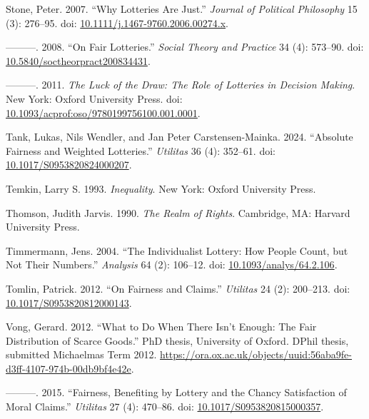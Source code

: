 \documentclass[
  11pt,
  letterpaper,
  DIV=11,
  numbers=noendperiod,
  twoside]{scrartcl}
\newlength{\cslhangindent}
\newenvironment{CSLReferences}[2] %
 {\begin{list}{}{%
  \setlength{\itemindent}{0pt}
  \setlength{\leftmargin}{0pt}
  \setlength{\parsep}{0pt}
  \ifodd #1
   \setlength{\leftmargin}{\cslhangindent}
   \setlength{\itemindent}{-1\cslhangindent}
  \fi
  \setlength{\itemsep}{#2\baselineskip}}}
 {\end{list}}
\begin{document}
\begin{CSLReferences}{1}{0}
Stone, Peter. 2007. {``Why Lotteries Are Just.''} \emph{Journal of
Political Philosophy} 15 (3): 276--95. doi:
\href{https://doi.org/10.1111/j.1467-9760.2006.00274.x}{10.1111/j.1467-9760.2006.00274.x}.

---------. 2008. {``On Fair Lotteries.''} \emph{Social Theory and
Practice} 34 (4): 573--90. doi:
\href{https://doi.org/10.5840/soctheorpract200834431}{10.5840/soctheorpract200834431}.

---------. 2011. \emph{The Luck of the Draw: The Role of Lotteries in
Decision Making}. New York: Oxford University Press. doi:
\href{https://doi.org/10.1093/acprof:oso/9780199756100.001.0001}{10.1093/acprof:oso/9780199756100.001.0001}.

Tank, Lukas, Nils Wendler, and Jan Peter Carstensen-Mainka. 2024.
{``Absolute Fairness and Weighted Lotteries.''} \emph{Utilitas} 36 (4):
352--61. doi:
\href{https://doi.org/10.1017/S0953820824000207}{10.1017/S0953820824000207}.

Temkin, Larry S. 1993. \emph{Inequality}. New York: Oxford University
Press.

Thomson, Judith Jarvis. 1990. \emph{The Realm of Rights}. Cambridge, MA:
Harvard University Press.

Timmermann, Jens. 2004. {``The Individualist Lottery: How People Count,
but Not Their Numbers.''} \emph{Analysis} 64 (2): 106--12. doi:
\href{https://doi.org/10.1093/analys/64.2.106}{10.1093/analys/64.2.106}.

Tomlin, Patrick. 2012. {``On Fairness and Claims.''} \emph{Utilitas} 24
(2): 200--213. doi:
\href{https://doi.org/10.1017/S0953820812000143}{10.1017/S0953820812000143}.

Vong, Gerard. 2012. {``What to Do When There Isn't Enough: The Fair
Distribution of Scarce Goods.''} PhD thesis, University of Oxford. DPhil
thesis, submitted Michaelmas Term 2012.
\url{https://ora.ox.ac.uk/objects/uuid:56aba9fe-d3ff-4107-974b-00db9bf4e42e}.

---------. 2015. {``Fairness, Benefiting by Lottery and the Chancy
Satisfaction of Moral Claims.''} \emph{Utilitas} 27 (4): 470--86. doi:
\href{https://doi.org/10.1017/S0953820815000357}{10.1017/S0953820815000357}.


\end{CSLReferences}
\end{document}
